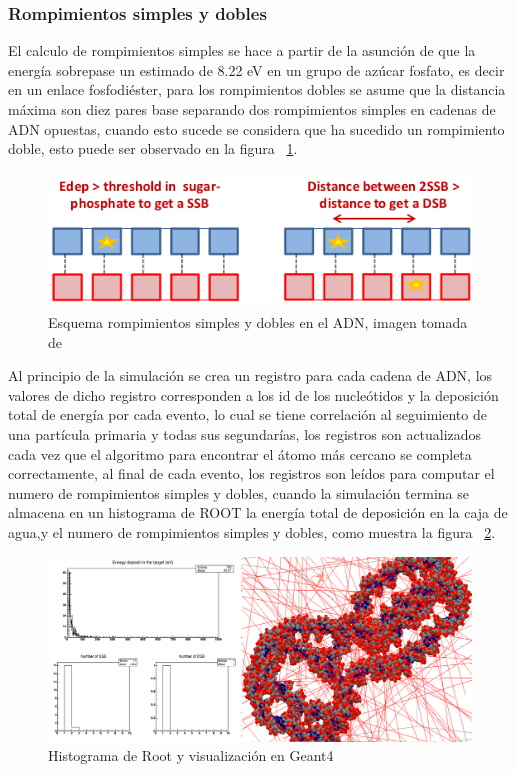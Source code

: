 \subsubsection{Rompimientos simples y dobles}
El calculo de rompimientos simples se hace a partir  de la asunción de que la energía sobrepase un estimado de 8.22 eV en un grupo de azúcar fosfato, es decir en un enlace fosfodiéster, para los rompimientos dobles se asume que la distancia máxima son diez pares base separando dos rompimientos simples en cadenas de ADN opuestas, cuando esto sucede se considera que ha sucedido un rompimiento doble\cite{pdblib}, esto puede ser observado en la figura ~\ref{fig:sbdb}.

\begin{figure}[htbp]
    \centering
    \includegraphics[width=.8\linewidth]{./Figures/romp.png}
    \caption[Esquema rompimientos simples y dobles en el ADN]{Esquema rompimientos simples y dobles en el ADN, imagen tomada de \cite{handson} }
    \label{fig:sbdb}
\end{figure}

Al principio de la simulación se crea un registro para cada cadena de ADN, los valores de dicho registro corresponden a los id de los nucleótidos y la deposición total de energía por cada evento, lo cual se tiene correlación al seguimiento de una partícula primaria y todas sus  segundarías, los registros son actualizados cada vez que el algoritmo para encontrar el átomo más cercano se completa correctamente, al final de cada evento, los registros son leídos para computar el numero de rompimientos simples y dobles, cuando la simulación termina se almacena  en un histograma de ROOT la energía total de deposición en la caja de agua,y el numero de rompimientos simples y dobles\cite{pdblib}, como muestra la figura ~\ref{fig:histosbdb}.

\begin{figure}[htbp]
    \centering
    \includegraphics[width=1\linewidth]{./Figures/c1.png}
    \caption[Histograma de Root]{Histograma de Root y visualización en Geant4}
    \label{fig:histosbdb}
\end{figure}

